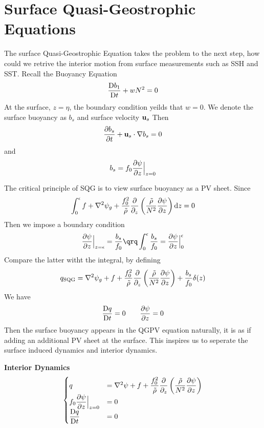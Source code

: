 \documentclass[../SQG_notes.tex]{subfiles}
\begin{document}
    \section{Surface Quasi-Geostrophic Equations}
    The surface Quasi-Geostrophic Equation takes the problem to the next step, how could we retrive the interior motion from surface measurements such as SSH and SST. Recall the Buoyancy Equation
    \begin{equation}
        \frac{\mathrm{D} b_1}{\mathrm{D} t} + wN^2 = 0
    \end{equation}
    At the surface, $z = \eta$, the boundary condition yeilds that $w = 0$. We denote the surface buoyancy as $b_s$ and surface velocity $\mathbf{u}_s$ Then 
    \[ \frac{\partial b_s}{\partial t} + \mathbf{u}_s \cdot \nabla b_s = 0\]
    and 
    \[ b_s = f_0 \frac{\partial \psi}{\partial z}\Big|_{z = 0}\]
    \begin{explanation}
    The critical principle of SQG is to view surface buoyancy as a PV sheet. Since 
    \[ \int_{0}^{\epsilon} f + \nabla^2 \psi_g +  \frac{f_0^2}{\tilde{\rho}}\frac{\partial }{\partial_z} \left( \frac{\tilde{\rho}}{N^2} \frac{\partial \psi}{\partial z}\right) \mathrm{d} z = 0\]
    Then we impose a boundary condition
    \[ \frac{\p \psi}{\p z} \Big|_{z = \epsilon} = \frac{b_s}{f_0} \qrq \int_{0}^{\epsilon} \frac{b_s}{f_0} = \frac{\p \psi}{\p z}\Big|^\epsilon_0\]
    Compare the latter witht the integral, by defining 
    \[ q_{\text{SQG}} = \nabla^2\psi_g + f + \frac{f_0^2}{\tilde{\rho}}\frac{\partial }{\partial_z} \left( \frac{\tilde{\rho}}{N^2} \frac{\partial \psi}{\partial z}\right)  + \frac{b_s}{f_0} \delta(z) \]
    We have 
    \[ \frac{\mathrm{D} q}{\mathrm{D} t} = 0 \qquad \frac{\partial \psi}{\partial z} = 0\]
    Then the surface buoyancy appears in the QGPV equation naturally, it is as if adding an additional PV sheet at the surface. This inspires us to seperate the surface induced dynamics and interior dynamics. 
    \end{explanation}
    \textbf{Interior Dynamics}
    \[\begin{cases}
        q &= \nabla^2 \psi + f + \dfrac{f_0^2}{\tilde{\rho}}\dfrac{\partial }{\partial_z} \left( \dfrac{\tilde{\rho}}{N^2} \dfrac{\partial \psi}{\partial z}\right) \\
        f_0 \dfrac{\partial \psi}{\partial z}\Big|_{z = 0} &= 0 \\
        \dfrac{\mathrm{D} q}{\mathrm{D} t} &= 0
    \end{cases}\]
\end{document}
